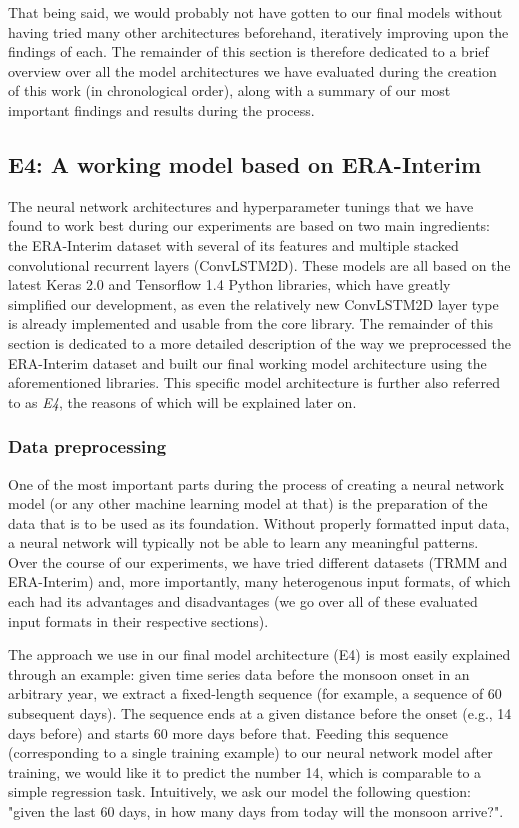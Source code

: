 That being said, we would probably not have gotten to our final models without having tried many other architectures beforehand, iteratively improving upon the findings of each. The remainder of this section is therefore dedicated to a brief overview over all the model architectures we have evaluated during the creation of this work (in chronological order), along with a summary of our most important findings and results during the process.

\subsection{E4: A working model based on ERA-Interim}
\label{sst:final_model}
The neural network architectures and hyperparameter tunings that we have found to work best during our experiments are based on two main ingredients: the ERA-Interim dataset with several of its features and multiple stacked convolutional recurrent layers (ConvLSTM2D). These models are all based on the latest Keras 2.0 and Tensorflow 1.4 Python libraries, which have greatly simplified our development, as even the relatively new ConvLSTM2D layer type is already implemented and usable from the core library. The remainder of this section is dedicated to a more detailed description of the way we preprocessed the ERA-Interim dataset and built our final working model architecture using the aforementioned libraries. This specific model architecture is further also referred to as \textit{E4}, the reasons of which will be explained later on.

\subsubsection{Data preprocessing}
One of the most important parts during the process of creating a neural network model (or any other machine learning model at that) is the preparation of the data that is to be used as its foundation. Without properly formatted input data, a neural network will typically not be able to learn any meaningful patterns. Over the course of our experiments, we have tried different datasets (TRMM and ERA-Interim) and, more importantly, many heterogenous input formats, of which each had its advantages and disadvantages (we go over all of these evaluated input formats in their respective sections).

The approach we use in our final model architecture (E4) is most easily explained through an example: given time series data before the monsoon onset in an arbitrary year, we extract a fixed-length sequence (for example, a sequence of 60 subsequent days). The sequence ends at a given distance before the onset (e.g., 14 days before) and starts 60 more days before that. Feeding this sequence (corresponding to a single training example) to our neural network model after training, we would like it to predict the number 14, which is comparable to a simple regression task. Intuitively, we ask our model the following question: "given the last 60 days, in how many days from today will the monsoon arrive?".

